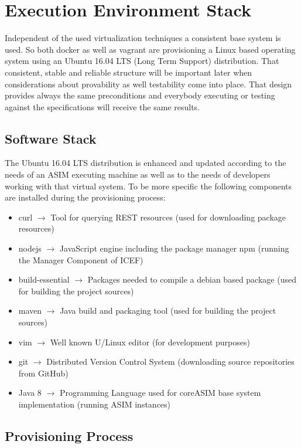\section{Execution Environment Stack}
\label{sec:exec-env-stack}

Independent of the used virtualization techniques a consistent base system is used. So both docker as well as vagrant are provisioning a Linux based operating system using an Ubuntu 16.04 LTS (Long Term Support) distribution.
That consistent, stable and reliable structure will be important later when considerations about provability as well testability come into place. That design provides always the same preconditions and everybody executing or testing against the specifications will receive the same results.

\subsection{Software Stack}
\label{sec:env-exec-stack-software-stack}

The Ubuntu 16.04 LTS distribution is enhanced and updated according to the needs of an ASIM executing machine as well as to the needs of developers working with that virtual system. To be more specific the following components are installed during the provisioning process:

\begin{itemize}
	\item curl $\rightarrow$ Tool for querying REST resources (used for downloading package resources)
	\item nodejs $\rightarrow$ JavaScript engine including the package manager npm (running the Manager Component of ICEF)
	\item build-essential $\rightarrow$ Packages needed to compile a debian based package (used for building the project sources)
	\item maven $\rightarrow$ Java build and packaging tool (used for building the project sources)
	\item vim $\rightarrow$ Well known U/Linux editor (for development purposes)
	\item git $\rightarrow$ Distributed Version Control System (downloading source repositories from GitHub)
	\item Java 8 $\rightarrow$ Programming Language used for coreASIM base system implementation (running ASIM instances)
\end{itemize}

\subsection{Provisioning Process}

